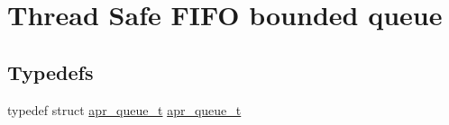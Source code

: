 \hypertarget{group___a_p_r___util___f_i_f_o}{\section{Thread Safe F\-I\-F\-O bounded queue}
\label{group___a_p_r___util___f_i_f_o}
}
\subsection*{Typedefs}
\begin{DoxyCompactItemize}
\item 
typedef struct \hyperlink{group___a_p_r___util___f_i_f_o_ga8c74c22abf47b63555a2109b06f83abb}{apr\-\_\-queue\-\_\-t} \hyperlink{group___a_p_r___util___f_i_f_o_ga8c74c22abf47b63555a2109b06f83abb}{apr\-\_\-queue\-\_\-t}
\end{DoxyCompactItemize}
